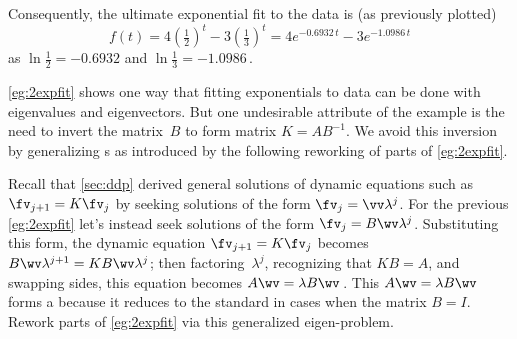 \begin{reduce}
\begin{example}
\begin{solution}
Consequently, the ultimate exponential fit to the data is (as previously plotted)
\begin{equation*}
f(t)=4(\tfrac12)^t-3(\tfrac13)^t
=4e^{-0.6932\,t}-3e^{-1.0986\,t}
\end{equation*}
as \(\ln\frac12=-0.6932\) and \(\ln \frac13=-1.0986\)\,.
\end{solution}
\end{example}



\autoref{eg:2expfit} shows one way that fitting exponentials to data can be done with eigenvalues and eigenvectors.
But one undesirable attribute of the example is the need to invert the matrix~\(B\) to form matrix \(K=AB^{-1}\).
We avoid this inversion by generalizing s as introduced by the following reworking of parts of \autoref{eg:2expfit}.

\begin{example} \label{eg:2expfit2}
Recall that \autoref{sec:ddp} derived general solutions of dynamic equations such as \(\fv_{j+1}=K\fv_j\) by seeking solutions of the form \(\fv_j=\vv\lambda^j\).
For the previous \autoref{eg:2expfit} let's instead seek solutions of the form \(\fv_j=B\wv\lambda^j\).
Substituting this form, the dynamic equation \(\fv_{j+1}=K\fv_j\) becomes \(B\wv\lambda^{j+1}=KB\wv\lambda^j\); then factoring~\(\lambda^j\), recognizing that \(KB=A\), and swapping sides, this equation becomes \(A\wv=\lambda B\wv\)\,.
This \(A\wv=\lambda B\wv\) forms a  because it reduces to the standard  in cases when the matrix \(B=I\).
Rework parts of \autoref{eg:2expfit} via this generalized eigen-problem.


\end{example}
\end{reduce}
